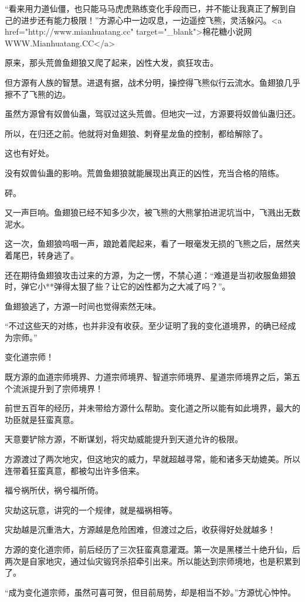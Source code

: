 \begin{this_body}
“看来用力道仙僵，也只能马马虎虎熟练变化手段而已，并不能让我真正了解到自己的进步还有能力极限！”方源心中一边叹息，一边遥控飞熊，灵活躲闪。<a href="http://www.mianhuatang.cc" target="\_blank">棉花糖小说网WWW.Mianhuatang.CC</a>

原来，那头荒兽鱼翅狼又爬了起来，凶性大发，疯狂攻击。

但方源有人族的智慧。进退有据，战术分明，操控得飞熊似行云流水。鱼翅狼几乎擦不了飞熊的边。

虽然方源曾有奴兽仙蛊，驾驭过这头荒兽。但地灾一过，方源要将奴兽仙蛊归还。

所以，在归还之前。他就将对鱼翅狼、刺脊星龙鱼的控制，都给解除了。

这也有好处。

没有奴兽仙蛊的影响。荒兽鱼翅狼就能展现出真正的凶性，充当合格的陪练。

砰。

又一声巨响。鱼翅狼已经不知多少次，被飞熊的大熊掌拍进泥坑当中，飞溅出无数泥水。

这一次，鱼翅狼呜咽一声，踉跄着爬起来，看了一眼毫发无损的飞熊之后，居然夹着尾巴，转身逃了。

还在期待鱼翅狼攻击过来的方源，为之一愣，不禁心道：“难道是当初收服鱼翅狼时，弹它小**弹得太狠了些？让它的凶性都为之大减了吗？”。

鱼翅狼逃了，方源一时间也觉得索然无味。

“不过这些天的对练，也并非没有收获。至少证明了我的变化道境界，的确已经成为宗师。”

变化道宗师！

既方源的血道宗师境界、力道宗师境界、智道宗师境界、星道宗师境界之后，第五个流派提升到了宗师境界！

前世五百年的经历，并未带给方源什么帮助。变化道之所以能有如此境界，最大的功臣就是狂蛮真意。

天意要铲除方源，不断谋划，将灾劫威能提升到天道允许的极限。

方源渡过了两次地灾，但这地灾的威力，早就超越寻常，能和诸多天劫媲美。所以连带着狂蛮真意，都被勾出许多倍来。

福兮祸所伏，祸兮福所倚。

灾劫这玩意，讲究的一个规律，就是福祸相等。

灾劫越是沉重浩大，方源越是危险困难，但渡过之后，收获得好处就越多！

方源的变化道宗师，前后经历了三次狂蛮真意灌溉。第一次是黑楼兰十绝升仙，后两次是自家地灾，通过仙灾锻窍杀招牵引出来。所以能达到宗师境地，也是积累到了。

“成为变化道宗师，虽然可喜可贺，但目前局势，却是相当不妙。”方源忧心忡忡。


\end{this_body}
